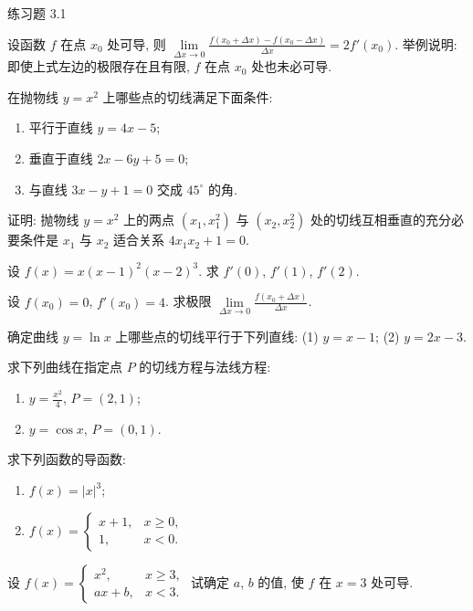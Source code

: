 \begin{exblock}{练习题 3.1}
  \item 设函数 $f$ 在点 $x_0$ 处可导, 则 $\lim\limits_{\Delta x\to0}\frac{f(x_0+\Delta x) - f(x_0-\Delta x)}{\Delta x} = 2f'(x_0)$. 举例说明: 即使上式左边的极限存在且有限, $f$ 在点 $x_0$ 处也未必可导.

  \item 在抛物线 $y = x^2$ 上哪些点的切线满足下面条件:
  \begin{enumerate}[label=(\arabic*)]
    \item 平行于直线 $y = 4x - 5$;
    \item 垂直于直线 $2x - 6y + 5 = 0$;
    \item 与直线 $3x - y + 1 = 0$ 交成 $45^\circ$ 的角.
  \end{enumerate}

  \item 证明: 抛物线 $y = x^2$ 上的两点 $(x_1, x_1^2)$ 与 $(x_2, x_2^2)$ 处的切线互相垂直的充分必要条件是 $x_1$ 与 $x_2$ 适合关系 $4x_1x_2 + 1 = 0$.

  \item 设 $f(x) = x(x-1)^2(x-2)^3$. 求 $f'(0)$, $f'(1)$, $f'(2)$.

  \item 设 $f(x_0) = 0$, $f'(x_0) = 4$. 求极限 $\lim\limits_{\Delta x\to0}\frac{f(x_0+\Delta x)}{\Delta x}$.

  \item 确定曲线 $y = \ln x$ 上哪些点的切线平行于下列直线: (1) $y = x - 1$; (2) $y = 2x - 3$.

  \item 求下列曲线在指定点 $P$ 的切线方程与法线方程:
  \begin{enumerate}[label=(\arabic*)]
    \item $y = \frac{x^2}{4}$, $P = (2,1)$;
    \item $y = \cos x$, $P = (0,1)$.
  \end{enumerate}

  \item 求下列函数的导函数:
  \begin{enumerate}[label=(\arabic*)]
    \item $f(x) = |x|^3$;
    \item $f(x) = \begin{cases}x+1, & x \geqslant 0,\\ 1, & x < 0.\end{cases}$
  \end{enumerate}

  \item 设 $f(x) = \begin{cases}x^2, & x \geqslant 3,\\ ax+b, & x < 3.\end{cases}$ 试确定 $a$, $b$ 的值, 使 $f$ 在 $x=3$ 处可导.


\end{exblock}

